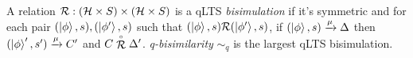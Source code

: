 
\begin{definition}
	A relation $\mathcal{R} : (\mathcal{H} \times S) \times (\mathcal{H} \times S)$ is a qLTS \emph{bisimulation} if it's symmetric and for each pair $(\ket{\phi}, s), (\ket{\phi'}, s)$ such that $(\ket{\phi}, s) \mathcal{R} (\ket{\phi'}, s)$,
	if $(\ket{\phi}, s) \xrightarrow{\mu} \Delta$ then $(\ket{\phi}', s') \xrightarrow{\mu} C'$ and $C \stackrel{\scriptscriptstyle \circ}{\mathcal{R}} \Delta'$.
	\emph{q-bisimilarity} $\sim_q$ is the largest qLTS bisimulation.
\end{definition}

